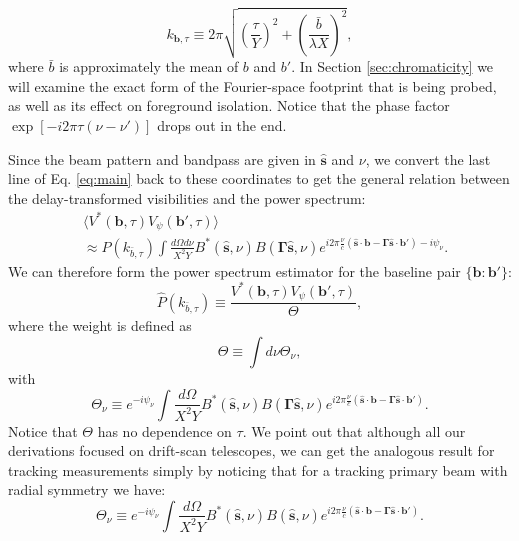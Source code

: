 \documentclass[twocolumn,apj,numberedappendix]{emulateapj}
\renewcommand\[{\begin{equation}}
\renewcommand\]{\end{equation}}
\begin{document}
\[
k_{\boldsymbol{b}, \tau} \equiv 2\pi \sqrt{\left(\frac{\tau}{Y}\right)^2 + \left(\frac{\bar{b}}{\lambda X}\right)^2},
\label{eq:kbtau}
\]
where $\bar{b}$ is approximately the mean of $b$ and $b'$. 
In Section \ref{sec:chromaticity} we will examine the exact form of the Fourier-space footprint that is being probed, as well as its effect on foreground isolation.  
Notice that the phase factor $\exp\left[-i2\pi\tau\left(\nu-\nu'\right)\right]$
drops out in the end.

Since the beam pattern and bandpass are given in $\hat{\boldsymbol{s}}$
and $\nu$, we convert the last line of Eq. \eqref{eq:main} back to these coordinates to get
the general relation between the delay-transformed visibilities and
the power spectrum:
\begin{equation}
\begin{aligned} & \langle V^{*}(\boldsymbol{b},\tau)V_{\psi}(\boldsymbol{b'},\tau)\rangle\\
 & \approx P(k_{\bar{b}, \tau})\int\frac{d\Omega d\nu}{X^{2}Y}B^{*}(\hat{\boldsymbol{s}},\nu)B(\boldsymbol{\Gamma}\hat{\boldsymbol{s}},\nu) e^{i2\pi\frac{\nu}{c}\left(\hat{\boldsymbol{s}}\cdot\boldsymbol{b}-\boldsymbol{\Gamma}\hat{\boldsymbol{s}}\cdot\boldsymbol{b'}\right)-i\psi_{\nu}}.
 \end{aligned}
\label{eq:final}
\end{equation}
We can therefore form the power spectrum estimator for the baseline pair $\{\boldsymbol b: \boldsymbol  b'\}$:
\begin{equation}
 \hat{P}(k_{\bar{b}, \tau}) \equiv \frac{V^{*}(\boldsymbol{b},\tau)V_{\psi}(\boldsymbol{b'},\tau)}{\Theta}, 
 \label{eq:opp}
\end{equation}
where the weight is defined as 
\begin{equation}
\Theta \equiv\int d\nu \Theta_{\nu}, 
\label{eq:Theta}
\end{equation}
with
\[
\Theta_{\nu} \equiv e^{-i\psi_{\nu}} \int \frac{d\Omega}{X^{2}Y}B^{*}(\hat{\boldsymbol{s}},\nu)B(\boldsymbol{\Gamma}\hat{\boldsymbol{s}},\nu) e^{i2\pi\frac{\nu}{c}\left(\hat{\boldsymbol{s}}\cdot\boldsymbol{b}-\boldsymbol{\Gamma}\hat{\boldsymbol{s}}\cdot\boldsymbol{b'}\right)}.
\label{eq:Thetanu}
\]
Notice that $\Theta$ has no dependence on $\tau$. We point out that although all our derivations focused on drift-scan telescopes, we can get the analogous result for tracking measurements simply by noticing that for a tracking primary beam with radial symmetry we have:
\[
\Theta_{\nu} \equiv e^{-i\psi_{\nu}} \int \frac{d\Omega}{X^{2}Y}B^{*}(\hat{\boldsymbol{s}},\nu)B(\hat{\boldsymbol{s}},\nu) e^{i2\pi\frac{\nu}{c}\left(\hat{\boldsymbol{s}}\cdot\boldsymbol{b}-\boldsymbol{\Gamma}\hat{\boldsymbol{s}}\cdot\boldsymbol{b'}\right)}.
\label{eq:Thetanu_tracking}
\]
\end{document}
